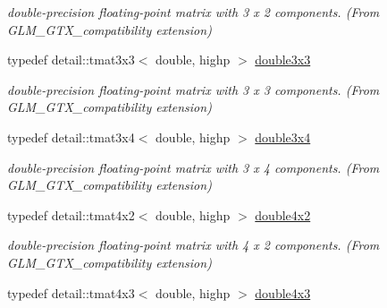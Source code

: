 \begin{CompactItemize}
\begin{CompactList}\small\item\em double-precision floating-point matrix with 3 x 2 components. (From GLM\_\-GTX\_\-compatibility extension) \item\end{CompactList}\item 
\hypertarget{group__gtx__compatibility_g2b56fa7536ae728c64fde99d6618139a}{
typedef detail::tmat3x3$<$ double, highp $>$ \hyperlink{group__gtx__compatibility_g2b56fa7536ae728c64fde99d6618139a}{double3x3}}
\label{group__gtx__compatibility_g2b56fa7536ae728c64fde99d6618139a}

\begin{CompactList}\small\item\em double-precision floating-point matrix with 3 x 3 components. (From GLM\_\-GTX\_\-compatibility extension) \item\end{CompactList}\item 
\hypertarget{group__gtx__compatibility_gb38107892c0116610e7de83126aff405}{
typedef detail::tmat3x4$<$ double, highp $>$ \hyperlink{group__gtx__compatibility_gb38107892c0116610e7de83126aff405}{double3x4}}
\label{group__gtx__compatibility_gb38107892c0116610e7de83126aff405}

\begin{CompactList}\small\item\em double-precision floating-point matrix with 3 x 4 components. (From GLM\_\-GTX\_\-compatibility extension) \item\end{CompactList}\item 
\hypertarget{group__gtx__compatibility_g816d1a516a5ec13511fe1ae703ddcf94}{
typedef detail::tmat4x2$<$ double, highp $>$ \hyperlink{group__gtx__compatibility_g816d1a516a5ec13511fe1ae703ddcf94}{double4x2}}
\label{group__gtx__compatibility_g816d1a516a5ec13511fe1ae703ddcf94}

\begin{CompactList}\small\item\em double-precision floating-point matrix with 4 x 2 components. (From GLM\_\-GTX\_\-compatibility extension) \item\end{CompactList}\item 
\hypertarget{group__gtx__compatibility_g1199ee41226db53d5f190d0628041845}{
typedef detail::tmat4x3$<$ double, highp $>$ \hyperlink{group__gtx__compatibility_g1199ee41226db53d5f190d0628041845}{double4x3}}
\label{group__gtx__compatibility_g1199ee41226db53d5f190d0628041845}


\end{CompactItemize}

